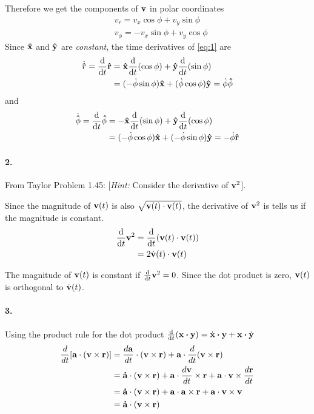 \documentclass[../hw.tex]{subfiles}
\begin{document}
Therefore we get the components of $\vb{v}$ in polar coordinates
\begin{align*}
    &\boxed{v_r = v_x \cos\phi + v_y \sin\phi} \\
    &\boxed{v_\phi = - v_x \sin\phi + v_y \cos\phi}
\end{align*}
Since $\vu{x}$ and $\vu{y}$ are \emph{constant}, the time derivatives of \eqref{eq:1} are
\begin{align*}
    \dot{\vu{r}} = \dv{t} \vu{r} &= \vu{x} \dv{t}(\cos\phi) + \vu{y} \dv{t}(\sin\phi) \\
    &= (-\dot\phi \sin\phi) \vu{x} + (\dot\phi \cos\phi) \vu{y} = \dot\phi \vu{\phi}
\end{align*}
and
\begin{align*}
    \dot{\vu{\phi}} = \dv{t} \vu{\phi} &= -\vu{x} \dv{t}(\sin\phi) + \vu{y} \dv{t}(\cos\phi) \\
    &= (-\dot\phi \cos\phi) \vu{x} + (-\dot\phi \sin\phi) \vu{y} = -\dot\phi \vu{r}
\end{align*}

\paragraph{2.}
From Taylor Problem 1.45: [\emph{Hint:} Consider the derivative of $ \vb{v}^2$].

Since the magnitude of $\vb{v}(t)$ is also $\sqrt{\vb{v}(t) \cdot \vb{v}(t)}$, the derivative of 
$\vb{v}^2$ is tells us if the magnitude is constant.
\begin{align*}
    \dv{t} \vb{v}^2 &= \dv{t} (\vb{v}(t) \cdot \vb{v}(t)) \\
    &= 2 \dot{\vb{v}}(t) \cdot \vb{v}(t)
\end{align*}

The magnitude of $\vb{v}(t)$ is constant if $\dv{t} \vb{v}^2 = 0$. Since the dot product is zero, 
$\vb{v}(t)$ is orthogonal to $\dot{\vb{v}}(t)$.

\paragraph{3.}
Using the product rule for the dot product $\dv{t}(\vb{x} \vdot \vb{y}) = \dot{\vb{x}} \vdot \vb{y}
+ \vb{x} \vdot \dot{\vb{y}}$
\begin{align*}
    \frac{d}{dt} [\mathbf{a} \cdot (\mathbf{v} \times \mathbf{r})] 
    &= \frac{d\mathbf{a}}{dt} \cdot (\mathbf{v} \times \mathbf{r}) 
    + \mathbf{a} \cdot \frac{d}{dt} (\mathbf{v} \times \mathbf{r}) \\
    &= \mathbf{\dot a} \cdot (\mathbf{v} \times \mathbf{r}) 
    + \mathbf{a} \cdot \frac{d\mathbf{v}}{dt} \times \mathbf{r} 
    + \mathbf{a} \cdot \mathbf{v} \times \frac{d\mathbf{r}}{dt} \\
    &= \mathbf{\dot a} \cdot (\mathbf{v} \times \mathbf{r}) 
    + \mathbf{a} \cdot \mathbf{a} \times \mathbf{r} + \mathbf{a} \cdot \mathbf{v} \times \mathbf{v} \\
    &= \mathbf{\dot a} \cdot (\mathbf{v} \times \mathbf{r})
\end{align*}
\end{document}
